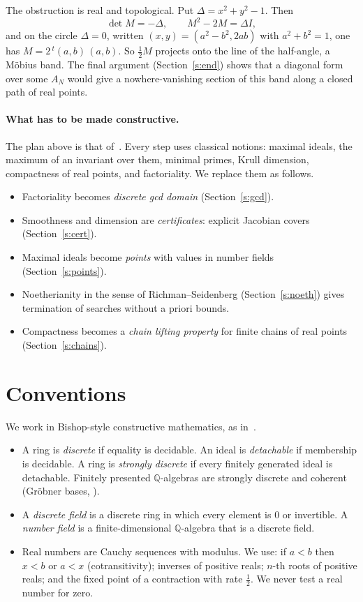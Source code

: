 \documentclass[11pt]{article}
\newcommand{\Q}{\mathbb{Q}}
\numberwithin{equation}{section}
\theoremstyle{plain}
\theoremstyle{definition}
\theoremstyle{remark}
\begin{document}
The obstruction is real and topological. Put $\Delta=x^2+y^2-1$. Then
\[
\det M=-\Delta,\qquad M^2-2M=\Delta I,
\]
and on the circle $\Delta=0$, written $(x,y)=(a^2-b^2,2ab)$ with $a^2+b^2=1$, one has
$M=2\,{}^t(a,b)\,(a,b)$. So $\frac12 M$ projects onto the line of the half-angle, a Möbius
band. The final argument (Section~\ref{s:end}) shows that a diagonal form over some $A_N$ would give
a nowhere-vanishing section of this band along a closed path of real points.

\paragraph{What has to be made constructive.} The plan above is that of~\cite{HM}. Every step
uses classical notions: maximal ideals, the maximum of an invariant over them, minimal primes,
Krull dimension, compactness of real points, and factoriality. We replace them as follows.
\begin{itemize}
\item Factoriality becomes \emph{discrete gcd domain} (Section~\ref{s:gcd}).
\item Smoothness and dimension are \emph{certificates}: explicit Jacobian covers
  (Section~\ref{s:cert}).
\item Maximal ideals become \emph{points} with values in number fields (Section~\ref{s:points}).
\item Noetherianity in the sense of Richman--Seidenberg (Section~\ref{s:noeth}) gives
  termination of searches without a priori bounds.
\item Compactness becomes a \emph{chain lifting property} for finite chains of real points
  (Section~\ref{s:chains}).
\end{itemize}

\section{Conventions}\label{s:conv}

We work in Bishop-style constructive mathematics, as in~\cite{LQ}.
\begin{itemize}
\item A ring is \emph{discrete} if equality is decidable. An ideal is \emph{detachable} if
  membership is decidable. A ring is \emph{strongly discrete} if every finitely generated ideal is
  detachable. Finitely presented $\Q$-algebras are strongly discrete and coherent (Gröbner bases,
  \cite[Chapter~VII]{LQ}).
\item A \emph{discrete field} is a discrete ring in which every element is $0$ or invertible.
  A \emph{number field} is a finite-dimensional $\Q$-algebra that is a discrete field.
\item Real numbers are Cauchy sequences with modulus. We use: if $a<b$ then $x<b$ or $a<x$
  (cotransitivity); inverses of positive reals; $n$-th roots of positive reals; and the fixed point of
  a contraction with rate $\frac12$. We never test a real number for zero.
\end{itemize}
\end{document}
